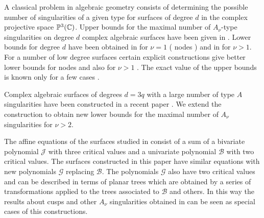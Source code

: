 \documentclass{birkjour_t2}
\theoremstyle{definition}
\theoremstyle{remark}
\numberwithin{equation}{section}
\begin{document}
A classical problem in algebraic geometry consists of determining the possible number of singularities of a given type for surfaces of degree $d$ in the complex  projective space  $\mathbb{P}^{3}({\Bbb{C}})$. Upper bounds for the maximal number of $A_{\nu}$-type singularities on degree $d$ complex algebraic surfaces have been given in \cite{var83, miy84}. Lower bounds for degree $d$ have been obtained in \cite{chm92, esc13} for $\nu = 1$ ( nodes ) and  in \cite{lab06, esc14b, esc26}  for $\nu > 1$. For a number of low degree surfaces certain explicit constructions give better lower bounds for nodes \cite{ cay69, kum64, tog40, bar96, end97, sar01, lab06b} and also for $\nu > 1$ \cite{lab06b, bor13, bon25}. The exact value of the upper bounds is known only for a few cases \cite{bea82, jaf97}.
 \par
Complex algebraic surfaces of degrees $d=3q$  with a large number of type $A$ singularities have been constructed in a recent paper  \cite{esc26}. We extend the construction to obtain new lower bounds for the maximal number of $A_{\nu}$ singularities for $\nu > 2$.
\par
The affine equations of the surfaces studied in \cite{esc26} consist of a sum of a bivariate polynomial ${\mathcal{J}}$ with three critical values and a univariate polynomial ${\mathcal{B}}$ with two critical values.  The surfaces constructed in this paper have similar equations with new polynomials ${\mathcal{G}}$ replacing ${\mathcal{B}}$. The polynomials ${\mathcal{G}}$ also have two critical values and can be described in terms of planar trees which are obtained by a series of transformations applied to the trees associated to ${\mathcal{B}}$ and others. In this way the results about cusps and other $A_{\nu}$ singularities obtained in \cite{esc14a, esc14b} can be seen as special cases of this constructions. 
\end{document}
